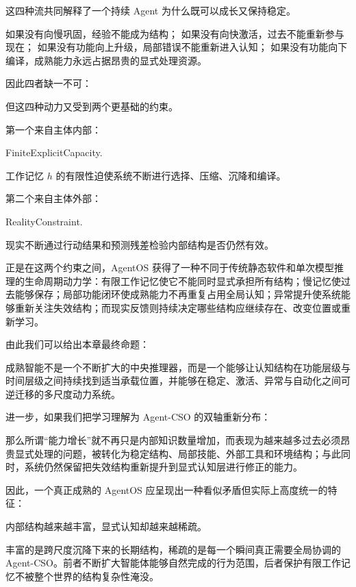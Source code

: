 这四种流共同解释了一个持续 Agent 为什么既可以成长又保持稳定。

如果没有向慢巩固，经验不能成为结构；
如果没有向快激活，过去不能重新参与现在；
如果没有功能向上升级，局部错误不能重新进入认知；
如果没有功能向下编译，成熟能力永远占据昂贵的显式处理资源。

因此四者缺一不可：
\begin{statementbox}
\centering
{}
\end{statementbox}

但这四种动力又受到两个更基础的约束。

第一个来自主体内部：
\begin{statementbox}
FiniteExplicitCapacity.
\end{statementbox}
工作记忆 $h$ 的有限性迫使系统不断进行选择、压缩、沉降和编译。

第二个来自主体外部：
\begin{statementbox}
RealityConstraint.
\end{statementbox}
现实不断通过行动结果和预测残差检验内部结构是否仍然有效。

正是在这两个约束之间，AgentOS 获得了一种不同于传统静态软件和单次模型推理的生命周期动力学：有限工作记忆使它不能同时显式承担所有结构；慢记忆使过去能够保存；局部功能闭环使成熟能力不再重复占用全局认知；异常提升使系统能够重新关注失效结构；而现实反馈则持续决定哪些结构应继续存在、改变位置或重新学习。

由此我们可以给出本章最终命题：

\begin{proposition*}
成熟智能不是一个不断扩大的中央推理器，而是一个能够让认知结构在功能层级与时间层级之间持续找到适当承载位置，并能够在稳定、激活、异常与自动化之间可逆迁移的多尺度动力系统。
\end{proposition*}

进一步，如果我们把学习理解为 Agent-CSO 的双轴重新分布：
\begin{statementbox}
\centering
{}
\end{statementbox}
那么所谓“能力增长”就不再只是内部知识数量增加，而表现为越来越多过去必须昂贵显式处理的问题，被转化为稳定结构、局部技能、外部工具和环境结构；与此同时，系统仍然保留把失效结构重新提升到显式认知层进行修正的能力。

因此，一个真正成熟的 AgentOS 应呈现出一种看似矛盾但实际上高度统一的特征：
\begin{statementbox}
内部结构越来越丰富，显式认知却越来越稀疏。
\end{statementbox}
丰富的是跨尺度沉降下来的长期结构，稀疏的是每一个瞬间真正需要全局协调的 Agent-CSO。前者不断扩大智能体能够自然完成的行为范围，后者保护有限工作记忆不被整个世界的结构复杂性淹没。

